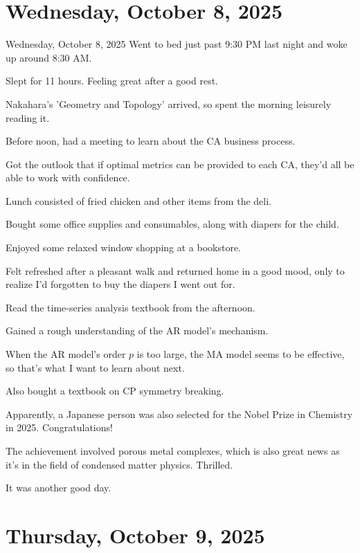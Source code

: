 \documentclass[dvipdfmx, autodetect-engine, aspectratio=169, 10.5pt]{beamer}
\begin{document}
\section{Wednesday, October 8, 2025}

\begin{frame}{Wednesday, October 8, 2025}
	\scriptsize
	Went to bed just past 9:30 PM last night and woke up around 8:30 AM.

	Slept for 11 hours. Feeling great after a good rest.

	Nakahara's 'Geometry and Topology' arrived, so spent the morning leisurely reading it.

	Before noon, had a meeting to learn about the CA business process.

	Got the outlook that if optimal metrics can be provided to each CA, they'd all be able to work with confidence.

	Lunch consisted of fried chicken and other items from the deli.

	Bought some office supplies and consumables, along with diapers for the child.

	Enjoyed some relaxed window shopping at a bookstore.

	Felt refreshed after a pleasant walk and returned home in a good mood, only to realize I'd forgotten to buy the diapers I went out for.

	Read the time-series analysis textbook from the afternoon.

	Gained a rough understanding of the AR model's mechanism.

	When the AR model's order $p$ is too large, the MA model seems to be effective, so that's what I want to learn about next.

	Also bought a textbook on CP symmetry breaking.

	Apparently, a Japanese person was also selected for the Nobel Prize in Chemistry in 2025. Congratulations!

	The achievement involved porous metal complexes, which is also great news as it's in the field of condensed matter physics. Thrilled.

	It was another good day.
\end{frame}

\section{Thursday, October 9, 2025}
\end{document}
